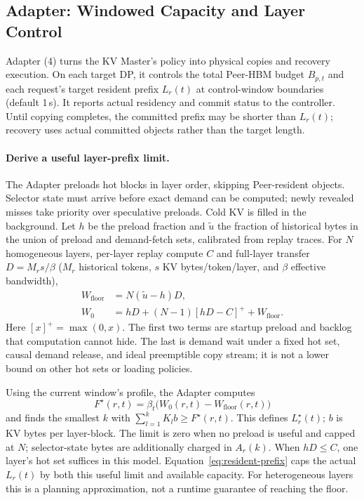 \subsection{Adapter: Windowed Capacity and Layer Control}
\label{sec:kv-runtime}
\label{sec:capacity-allocation}

Adapter (4) turns the KV Master's policy into physical copies and
recovery execution. On each target DP, it controls the total Peer-HBM
budget $B_{p,t}$ and each request's target resident prefix $L_r(t)$ at
control-window boundaries (default 1\,s). It reports actual residency
and commit status to the controller. Until copying completes, the
committed prefix may be shorter than $L_r(t)$; recovery uses actual
committed objects rather than the target length.



\paragraph{Derive a useful layer-prefix limit.}
The Adapter preloads hot blocks in layer order, skipping Peer-resident
objects. Selector state must arrive before exact demand can be computed;
newly revealed misses take priority over speculative preloads. Cold KV
is filled in the background. Let $h$ be the preload fraction and
$\widetilde u$ the fraction of historical bytes in the union of preload
and demand-fetch sets, calibrated from replay traces. For $N$ homogeneous
layers, per-layer replay compute $C$ and full-layer transfer
$D=M_rs/\beta$ ($M_r$ historical tokens, $s$ KV bytes/token/layer, and
$\beta$ effective bandwidth),
\begin{align}
 W_{\mathrm{floor}}&=N(\widetilde u-h)D,\label{eq:demand-floor}\\
 W_0&=hD+(N-1)[hD-C]^++W_{\mathrm{floor}}.\label{eq:exposed-wait}
\end{align}
Here $[x]^+=\max(0,x)$. The first two terms are startup preload and
backlog that computation cannot hide. The last is demand wait under a
fixed hot set, causal demand release, and ideal preemptible copy stream;
it is not a lower bound on other hot sets or loading policies.

Using the current window's profile, the Adapter computes
\begin{equation}
 F^\star(r,t)=\beta_t\bigl(W_0(r,t)-W_{\mathrm{floor}}(r,t)\bigr)
 \label{eq:peer-byte-target}
\end{equation}
and finds the smallest $k$ with $\sum_{l=1}^{k}K_lb\ge F^\star(r,t)$.
This defines $L_r^\star(t)$; $b$ is KV bytes per layer-block.
The limit is zero when no preload is useful and capped at $N$;
selector-state bytes are additionally charged in $A_r(k)$.
When $hD\le C$, one layer's hot set suffices in this model.
Equation~\ref{eq:resident-prefix} caps the actual $L_r(t)$ by both this
useful limit and available capacity. For heterogeneous layers this is
a planning approximation, not a runtime guarantee of reaching the floor.

